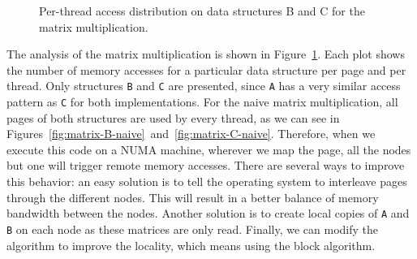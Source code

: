 \begin{figure}[!t]
    \centering
    \caption{Per-thread access distribution on data structures B and C for the
    matrix multiplication.}
    \label{fig:matrix-analysis}
\end{figure}
The analysis of the matrix multiplication is shown in Figure~\ref{fig:matrix-analysis}.
Each plot shows the number of memory accesses for a particular data structure
per page and per thread. Only structures \texttt{B} and \texttt{C} are
presented, since \texttt{A} has a very similar access
pattern as \texttt{C} for both implementations.
For the naive matrix multiplication, all pages of both structures are used by every
thread, as we can see in
Figures~\ref{fig:matrix-B-naive}~and~\ref{fig:matrix-C-naive}. Therefore, when we execute this code on a NUMA machine, wherever we
map the page, all the nodes but one will trigger remote memory accesses. There
are several ways to improve this behavior: an easy solution
is to tell the operating system to interleave pages through the different
nodes. This will result in a better balance of memory bandwidth between the
nodes. Another solution is to create local copies of \texttt{A} and
\texttt{B} on each node as these matrices are only read. Finally, we can modify
the algorithm to improve the locality, which means using the block algorithm.


